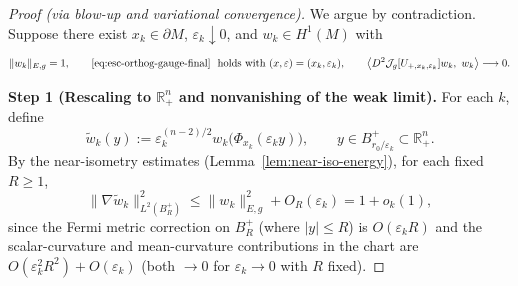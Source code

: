 \documentclass[11pt,reqno,a4paper]{amsart}
\newcommand{\R}{\mathbb{R}}
\numberwithin{equation}{section}
\theoremstyle{plain}
\theoremstyle{remark}
\theoremstyle{plain}
\begin{document}
\begin{proof}[Proof (via blow-up and variational convergence)]
We argue by contradiction. Suppose there exist $x_k\in\partial M$, $\varepsilon_k\downarrow0$, and $w_k\in H^1(M)$ with
\begin{equation}\label{eq:contr-setup}
\|w_k\|_{E,g}=1,\qquad
\eqref{eq:esc-orthog-gauge-final}\ \text{ holds with }(x,\varepsilon)=(x_k,\varepsilon_k),
\qquad
\big\langle D^2\mathcal J_g[U_{+,x_k,\varepsilon_k}]w_k,\ w_k\big\rangle \longrightarrow 0 .
\end{equation}

\smallskip\noindent\textbf{Step 1 (Rescaling to $\R^n_+$ and nonvanishing of the weak limit).}
For each $k$, define
\[
\widetilde w_k(y)
:=\varepsilon_k^{(n-2)/2}w_k\big(\Phi_{x_k}(\varepsilon_k y)\big),
\qquad y\in B_{r_0/\varepsilon_k}^+\subset\R^n_+.
\]
By the near-isometry estimates (Lemma~\ref{lem:near-iso-energy}),
for each fixed $R\ge1$,
\begin{equation}\label{eq:per-ball-bound}
\|\nabla\widetilde w_k\|_{L^2(B_R^+)}^2
\le \|w_k\|_{E,g}^2+O_R(\varepsilon_k)=1+o_k(1),
\end{equation}
since the Fermi metric correction on $B_R^+$ (where $|y|\le R$)
is $O(\varepsilon_k R)$
and the scalar-curvature and mean-curvature contributions
in the chart are $O(\varepsilon_k^2 R^2)+O(\varepsilon_k)$
(both $\to0$ for $\varepsilon_k\to0$ with $R$ fixed).


\end{proof}
\end{document}
